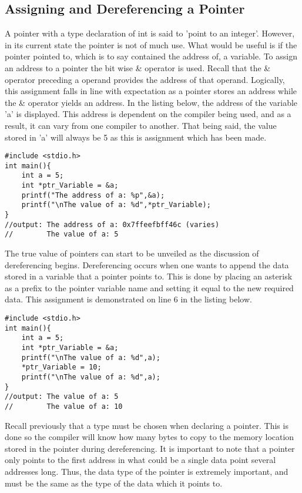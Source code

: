 \documentclass[two column, 10pt]{article}
\begin{document}
\subsection{Assigning and Dereferencing a Pointer}
A pointer with a type declaration of int is said to 'point to an integer'. However, in its current state the pointer is not of much use. What would be useful is if the pointer pointed to, which is to say contained the address of, a variable. To assign an address to a pointer the bit wise \& operator is used. Recall that the \& operator preceding a operand provides the address of that operand. Logically, this assignment falls in line with expectation as a pointer stores an address while the \& operator yields an address. In the listing below, the address of the variable 'a' is displayed. This address is dependent on the compiler being used, and as a result, it can vary from one compiler to another. That being said, the value stored in 'a' will always be 5 as this is assignment which has been made.
\begin{lstlisting}[style=CStyle,
caption={Assigning a Pointer Variable},captionpos=b]
#include <stdio.h>
int main(){
    int a = 5;
    int *ptr_Variable = &a;
    printf("The address of a: %p",&a);
    printf("\nThe value of a: %d",*ptr_Variable);
}
//output: The address of a: 0x7ffeefbff46c (varies)
//        The value of a: 5
\end{lstlisting}
The true value of pointers can start to be unveiled as the discussion of dereferencing begins. Dereferencing occurs when one wants to append the data stored in a variable that a pointer points to. This is done by placing an asterisk as a prefix to the pointer variable name and setting it equal to the new required data. This assignment is demonstrated on line 6 in the listing below. 
\begin{lstlisting}[style=CStyle,
caption={Dereferencing a Pointer Variable},captionpos=b]
#include <stdio.h>
int main(){
    int a = 5;
    int *ptr_Variable = &a;
    printf("\nThe value of a: %d",a);
    *ptr_Variable = 10;
    printf("\nThe value of a: %d",a);
}
//output: The value of a: 5
//        The value of a: 10
\end{lstlisting}
Recall previously that a type must be chosen when declaring a pointer. This is done so the compiler will know how many bytes to copy to the memory location stored in the pointer during dereferencing. It is important to note that a pointer only points to the first address in what could be a single data point several addresses long. Thus, the data type of the pointer is extremely important, and must be the same as the type of the data which it points to. 
\end{document}

